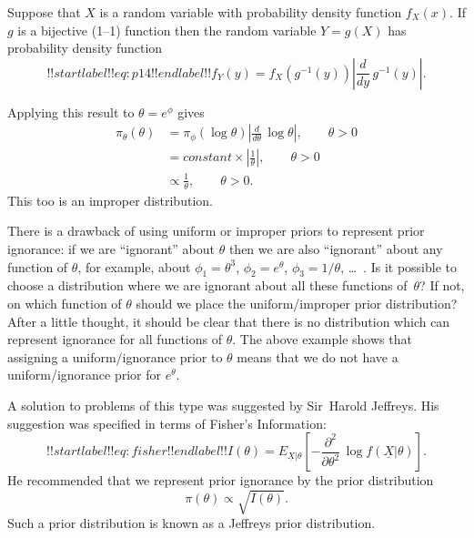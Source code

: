 Suppose that $X$ is a random variable with probability density function $f_X(x)$. If $g$ is a bijective (1--1) function then the random variable $Y=g(X)$ has probability density function
\begin{equation}
!!startlabel!! eq:p14 !!endlabel!!
f_Y(y)=f_X\left(g^{-1}(y)\right)\left|\frac{d}{dy}\,g^{-1}(y)\right|.
\end{equation}

Applying this result to $\theta=e^\phi$ gives
\begin{align*}
\pi_\theta(\theta)
&=\pi_\phi(\log\theta)\left|\frac{d}{d\theta}\,\log\theta\right|,
\quad\quad\theta>0 \\
&=constant\times\left|\frac{1}{\theta}\right|,\quad\quad\theta>0 \\
&\propto\frac{1}{\theta},\quad\quad\theta>0.
\end{align*}
This too is an improper distribution.

There is a drawback of using uniform or improper priors to represent prior ignorance: if we are ``ignorant'' about $\theta$ then we are also ``ignorant'' about any function of $\theta$, for example, about
$\phi_1=\theta^3$, $\phi_2=e^\theta$, $\phi_3=1/\theta$,
\ldots~. Is it possible to choose a distribution where we are ignorant about all these functions of~$\theta$? If not, on which function of $\theta$ should we place the uniform/improper prior distribution? After a little thought, it should be clear that there is no distribution which can represent ignorance for all functions of $\theta$. The above example shows that assigning a uniform/ignorance prior to $\theta$ means that we do not have a uniform/ignorance prior for $e^\theta$.

A solution to problems of this type was suggested by Sir~Harold Jeffreys. His suggestion was specified in terms of Fisher's Information:
\begin{equation}
!!startlabel!! eq:fisher !!endlabel!!
I(\theta)=E_{\underline{X}|\theta}\left[-
\frac{\partial^2}{\partial\theta^{2}}\,
\log f(\underline{X}|\theta)\right].
\end{equation}
He recommended that we represent prior ignorance by the prior distribution
\begin{equation}
\pi(\theta)\propto \sqrt{I(\theta)}.
\end{equation}
Such a prior distribution is known as a Jeffreys prior distribution.

